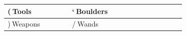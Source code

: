 \begin{longtable}{|>{\RaggedRight}p{0.33128\linewidth}|>{\RaggedRight}p{0.24182\linewidth}|>{\RaggedRight}p{0.34118\linewidth}|}
\hspace*{0pt}\ignorespaces{}\hspace*{0pt}({\mbox{$~$}}Tools\footnotemark[12]&\hspace*{0pt}\ignorespaces{}\hspace*{0pt}`{\mbox{$~$}}Boulders\footnotemark[13]\\ \hline \hspace*{0pt}\ignorespaces{}\hspace*{0pt}){\mbox{$~$}}Weapons\footnotemark[14]&\hspace*{0pt}\ignorespaces{}\hspace*{0pt}/{\mbox{$~$}}Wands\footnotemark[15]\\ \hline 
\end{longtable}





